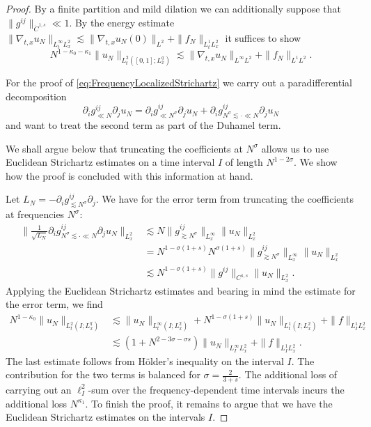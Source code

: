 \documentclass{amsart}
\theoremstyle{definition}
\begin{document}
\begin{proof}
By a finite partition and mild dilation we can additionally suppose that $\| g^{ij} \|_{\dot{C}^{1,s}} \ll 1$.
By the energy estimate $\| \nabla_{t,x} u_N \|_{L_t^\infty L_x^2} \lesssim \| \nabla_{t,x} u_N(0) \|_{L^2} + \| f_N \|_{L_t^1 L_x^2}$ it suffices to show
\begin{equation}
\label{eq:FrequencyLocalizedStrichartz}
N^{1-\kappa_0-\kappa_1} \| u_N \|_{L_t^2([0,1];L^q_x)} \lesssim \| \nabla_{t,x} u_N \|_{L^{\infty} L^2} + \| f_N \|_{L^1 L^2}.
\end{equation}

For the proof of \eqref{eq:FrequencyLocalizedStrichartz} we carry out a paradifferential decomposition
\begin{equation*}
    \partial_i g^{ij}_{\ll N} \partial_j u_N = \partial_i g^{ij}_{\ll N^{\sigma}} \partial_j u_N + \partial_i g^{ij}_{N^{\sigma} \lesssim \cdot \ll N } \partial_j u_N
\end{equation*}
and want to treat the second term as part of the Duhamel term.

We shall argue below that truncating the coefficients at $N^{\sigma}$ allows us to use Euclidean Strichartz estimates on a time interval $I$ of length $N^{1-2\sigma}$. We show how the proof is concluded with this information at hand.

Let $L_N = - \partial_i g^{ij}_{\lesssim N^{\sigma}} \partial_j$. 
We have for the error term from truncating the coefficients at frequencies $N^{\sigma}$:
\begin{equation*}
\begin{split}
\big\| \frac{1}{\sqrt{L_N}} \partial_i g^{ij}_{N^{\sigma} \lesssim \cdot \ll N} \partial_j u_N \big\|_{L^2_x} &\lesssim N \| g^{ij}_{\gtrsim N^{\sigma}} \|_{L_x^\infty} \| u_N \|_{L^2_x} \\
&= N^{1-\sigma(1+s)} N^{\sigma(1+s)} \| g^{ij}_{\gtrsim N^{\sigma}} \|_{L_x^\infty} \| u_N \|_{L^2_x} \\
&\lesssim N^{1-\sigma(1+s)} \| g^{ij} \|_{C^{1,s}} \| u_N \|_{L^2_x}.
\end{split}
\end{equation*}
Applying the Euclidean Strichartz estimates and bearing in mind the estimate for the error term, we find
\begin{equation*}
\begin{split}
    N^{1-\kappa_0} \| u_N \|_{L_t^2(I;L_x^q)} &\lesssim \| u_N \|_{L^{\infty}_t(I;L_x^2)} + N^{1-\sigma(1+s)} \| u_N \|_{L_t^1(I;L_x^2)} + \| f \|_{L_I^1 L_x^2} \\
    &\lesssim (1+ N^{2-3 \sigma -\sigma s}) \| u_N \|_{L_I^{\infty} L_x^2} + \| f \|_{L_I^1 L_x^2}.
    \end{split}
\end{equation*}
The last estimate follows from H\"older's inequality on the interval $I$.
The contribution for the two terms is balanced for $\sigma = \frac{2}{3+s}$. The additional loss of carrying out an $\ell^2_I$-sum over the frequency-dependent time intervals incurs the additional loss $N^{\kappa_1}$. To finish the proof, it remains to argue that we have the Euclidean Strichartz estimates on the intervals $I$.


\end{proof}
\end{document}

